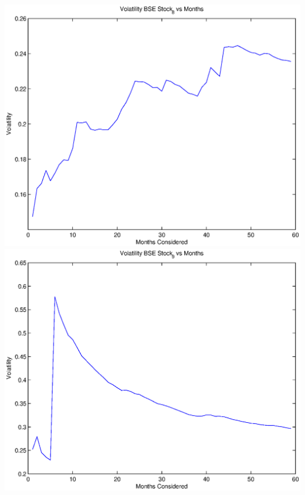 \documentclass{article}
\begin{document}
\includegraphics[width=\textwidth]{Volatility_BSE_Stock_8_vs_Months} \\

\includegraphics[width=\textwidth]{Volatility_BSE_Stock_9_vs_Months} \\
\end{document}
